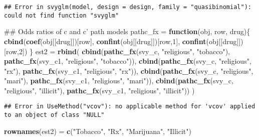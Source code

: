 \documentclass[]{article}
\newenvironment{Shaded}{\begin{snugshade}}{\end{snugshade}}
\newcommand{\KeywordTok}[1]{\textcolor[rgb]{0.13,0.29,0.53}{\textbf{#1}}}
\newcommand{\DecValTok}[1]{\textcolor[rgb]{0.00,0.00,0.81}{#1}}
\newcommand{\StringTok}[1]{\textcolor[rgb]{0.31,0.60,0.02}{#1}}
\newcommand{\ControlFlowTok}[1]{\textcolor[rgb]{0.13,0.29,0.53}{\textbf{#1}}}
\newcommand{\NormalTok}[1]{#1}
\begin{document}
\begin{verbatim}
## Error in svyglm(model, design = design, family = "quasibinomial"): could not find function "svyglm"
\end{verbatim}

\begin{Shaded}
\begin{Highlighting}[]
\NormalTok{## Odds ratios of c and c' path models}
\NormalTok{pathc_fx =}\StringTok{ }\ControlFlowTok{function}\NormalTok{(obj, row, drug)\{}
  \KeywordTok{cbind}\NormalTok{(}\KeywordTok{coef}\NormalTok{(obj[[drug]])[row], }
            \KeywordTok{confint}\NormalTok{(obj[[drug]])[row,}\DecValTok{1}\NormalTok{], }
            \KeywordTok{confint}\NormalTok{(obj[[drug]])[row,}\DecValTok{2}\NormalTok{])}
\NormalTok{\}}
\NormalTok{est2 =}
\StringTok{  }\KeywordTok{rbind}\NormalTok{(}
    \KeywordTok{cbind}\NormalTok{(}\KeywordTok{pathc_fx}\NormalTok{(svy_c, }\StringTok{"religious"}\NormalTok{, }\StringTok{"tobacco"}\NormalTok{),}
          \KeywordTok{pathc_fx}\NormalTok{(svy_c1, }\StringTok{"religious"}\NormalTok{, }\StringTok{"tobacco"}\NormalTok{)),}
    \KeywordTok{cbind}\NormalTok{(}\KeywordTok{pathc_fx}\NormalTok{(svy_c, }\StringTok{"religious"}\NormalTok{, }\StringTok{"rx"}\NormalTok{),}
          \KeywordTok{pathc_fx}\NormalTok{(svy_c1, }\StringTok{"religious"}\NormalTok{, }\StringTok{"rx"}\NormalTok{)),}
    \KeywordTok{cbind}\NormalTok{(}\KeywordTok{pathc_fx}\NormalTok{(svy_c, }\StringTok{"religious"}\NormalTok{, }\StringTok{"mari"}\NormalTok{),}
          \KeywordTok{pathc_fx}\NormalTok{(svy_c1, }\StringTok{"religious"}\NormalTok{, }\StringTok{"mari"}\NormalTok{)),}
    \KeywordTok{cbind}\NormalTok{(}\KeywordTok{pathc_fx}\NormalTok{(svy_c, }\StringTok{"religious"}\NormalTok{, }\StringTok{"illicit"}\NormalTok{),}
          \KeywordTok{pathc_fx}\NormalTok{(svy_c1, }\StringTok{"religious"}\NormalTok{, }\StringTok{"illicit"}\NormalTok{))}
\NormalTok{)}
\end{Highlighting}
\end{Shaded}

\begin{verbatim}
## Error in UseMethod("vcov"): no applicable method for 'vcov' applied to an object of class "NULL"
\end{verbatim}

\begin{Shaded}
\begin{Highlighting}[]
\KeywordTok{rownames}\NormalTok{(est2) =}\StringTok{ }\KeywordTok{c}\NormalTok{(}\StringTok{"Tobacco"}\NormalTok{, }\StringTok{"Rx"}\NormalTok{,}
                   \StringTok{"Marijuana"}\NormalTok{, }\StringTok{"Illicit"}\NormalTok{)}
\end{Highlighting}
\end{Shaded}
\end{document}
